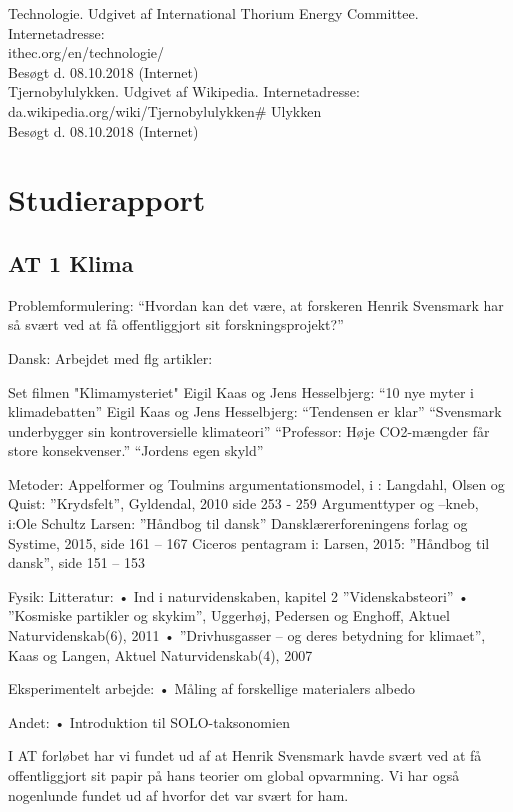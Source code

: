 \documentclass{article}
\begin{document}
Technologie. Udgivet af International Thorium Energy Committee. Internetadresse:\\
ithec.org/en/technologie/\\
Besøgt d. 08.10.2018 (Internet)\\

Tjernobylulykken. Udgivet af Wikipedia. Internetadresse:\\
da.wikipedia.org/wiki/Tjernobylulykken\# Ulykken\\
Besøgt d. 08.10.2018 (Internet)\\

\section{Studierapport}

\subsection{AT 1 Klima}

Problemformulering:
“Hvordan kan det være, at forskeren Henrik Svensmark har så svært ved at få offentliggjort sit forskningsprojekt?”

Dansk:
Arbejdet med flg artikler:

Set filmen "Klimamysteriet"
Eigil Kaas og Jens Hesselbjerg: “10 nye myter i klimadebatten”
Eigil Kaas og Jens Hesselbjerg: “Tendensen er klar”
“Svensmark underbygger sin kontroversielle klimateori”
“Professor: Høje CO2-mængder får store konsekvenser.”
“Jordens egen skyld”

Metoder:
Appelformer og Toulmins argumentationsmodel, i : Langdahl, Olsen og Quist:  ”Krydsfelt”, Gyldendal, 2010 side 253 - 259
Argumenttyper og –kneb, i:Ole Schultz Larsen: ”Håndbog til dansk” Dansklærerforeningens forlag og Systime, 2015, side 161 – 167
Ciceros pentagram i: Larsen, 2015: ”Håndbog til dansk”, side 151 – 153

Fysik:
Litteratur: 
•	Ind i naturvidenskaben, kapitel 2 ”Videnskabsteori”
•	”Kosmiske partikler og skykim”, Uggerhøj, Pedersen og Enghoff, Aktuel Naturvidenskab(6), 2011
•	”Drivhusgasser – og deres betydning for klimaet”, Kaas og Langen, Aktuel Naturvidenskab(4), 2007

Eksperimentelt arbejde: 
•	Måling af forskellige materialers albedo

Andet:
•	Introduktion til SOLO-taksonomien

I AT forløbet har vi fundet ud af at Henrik Svensmark havde svært ved at få offentliggjort sit papir på hans teorier om global opvarmning. Vi har også nogenlunde fundet ud af hvorfor det var svært for ham. 
\end{document}
